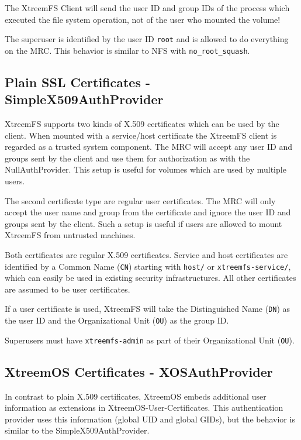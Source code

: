 \documentclass[a4paper,10pt]{book}
\begin{document}
The XtreemFS Client will send the user ID and group IDs of the process which executed the file system operation, not of the user who mounted the volume!

The superuser is identified by the user ID \texttt{root} and is allowed to do everything on the MRC. This behavior is similar to NFS with \texttt{no\_root\_squash}.

\subsection{Plain SSL Certificates - SimpleX509AuthProvider}

XtreemFS supports two kinds of X.509 certificates which can be used by the client. When mounted with a service/host certificate the XtreemFS client is regarded as a trusted system component. The MRC will accept any user ID and groups sent by the client and use them for authorization as with the NullAuthProvider. This setup is useful for volumes which are used by multiple users.

The second certificate type are regular user certificates. The MRC will only accept the user name and group from the certificate and ignore the user ID and groups sent by the client. Such a setup is useful if users are allowed to mount XtreemFS from untrusted machines.

Both certificates are regular X.509 certificates. Service and host certificates are identified by a Common Name (\texttt{CN}) starting with \texttt{host/} or \texttt{xtreemfs-service/}, which can easily be used in existing security infrastructures. All other certificates are assumed to be user certificates.

If a user certificate is used, XtreemFS will take the Distinguished Name (\texttt{DN}) as the user ID and the Organizational Unit (\texttt{OU}) as the group ID.

Superusers must have \texttt{xtreemfs-admin} as part of their Organizational Unit (\texttt{OU}).

\subsection{XtreemOS Certificates - XOSAuthProvider}

In contrast to plain X.509 certificates, XtreemOS embeds additional user information as extensions in XtreemOS-User-Certificates. This authentication provider uses this information (global UID and global GIDs), but the behavior is similar to the SimpleX509AuthProvider.
\end{document}
